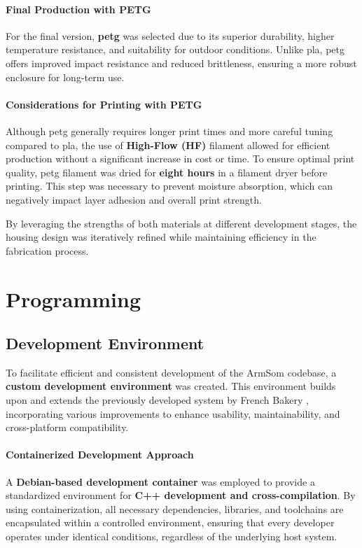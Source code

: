 \paragraph{Final Production with PETG}  
For the final version, \textbf{\acrfull{petg}} was selected due to its superior durability, higher temperature resistance, and suitability for outdoor conditions. Unlike \acrshort{pla}, \acrshort{petg} offers improved impact resistance and reduced brittleness, ensuring a more robust enclosure for long-term use.  

\paragraph{Considerations for Printing with PETG}  
Although \acrshort{petg} generally requires longer print times and more careful tuning compared to \acrshort{pla}, the use of \textbf{High-Flow (HF)} filament allowed for efficient production without a significant increase in cost or time. To ensure optimal print quality, \acrshort{petg} filament was dried for \textbf{eight hours} in a filament dryer before printing. This step was necessary to prevent moisture absorption, which can negatively impact layer adhesion and overall print strength.  

By leveraging the strengths of both materials at different development stages, the housing design was iteratively refined while maintaining efficiency in the fabrication process.


\section{Programming}
\subsection{Development Environment}  

To facilitate efficient and consistent development of the ArmSom codebase, a \textbf{custom development environment} was created. This environment builds upon and extends the previously developed system by French Bakery \cite{fb_dev_environment}, incorporating various improvements to enhance usability, maintainability, and cross-platform compatibility.  

\paragraph{Containerized Development Approach}  
A \textbf{Debian-based development container} was employed to provide a standardized environment for \textbf{C++ development and cross-compilation}. By using containerization, all necessary dependencies, libraries, and toolchains are encapsulated within a controlled environment, ensuring that every developer operates under identical conditions, regardless of the underlying host system.  


